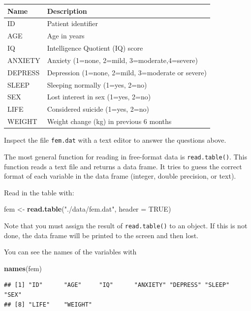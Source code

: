 \documentclass[
]{book}
\newenvironment{Shaded}{\begin{snugshade}}{\end{snugshade}}
\newcommand{\AttributeTok}[1]{\textcolor[rgb]{0.13,0.29,0.53}{#1}}
\newcommand{\ConstantTok}[1]{\textcolor[rgb]{0.56,0.35,0.01}{#1}}
\newcommand{\FunctionTok}[1]{\textcolor[rgb]{0.13,0.29,0.53}{\textbf{#1}}}
\newcommand{\NormalTok}[1]{#1}
\newcommand{\OtherTok}[1]{\textcolor[rgb]{0.56,0.35,0.01}{#1}}
\newcommand{\StringTok}[1]{\textcolor[rgb]{0.31,0.60,0.02}{#1}}
\begin{document}
\begin{longtable}[]{@{}ll@{}}
\toprule\noalign{}
Name & Description \\
\midrule\noalign{}
\endhead
\bottomrule\noalign{}
\endlastfoot
ID & Patient identifier \\
AGE & Age in years \\
IQ & Intelligence Quotient (IQ) score \\
ANXIETY & Anxiety (1=none, 2=mild, 3=moderate,4=severe) \\
DEPRESS & Depression (1=none, 2=mild, 3=moderate or severe) \\
SLEEP & Sleeping normally (1=yes, 2=no) \\
SEX & Lost interest in sex (1=yes, 2=no) \\
LIFE & Considered suicide (1=yes, 2=no) \\
WEIGHT & Weight change (kg) in previous 6 months \\
\end{longtable}

Inspect the file \texttt{fem.dat} with a text editor to answer the
questions above.

The most general function for reading in free-format data is
\texttt{read.table()}. This function reads a text file and returns a
data frame. It tries to guess the correct format of each variable in
the data frame (integer, double precision, or text).

Read in the table with:

\begin{Shaded}
\begin{Highlighting}[]
\NormalTok{fem }\OtherTok{\textless{}{-}} \FunctionTok{read.table}\NormalTok{(}\StringTok{"./data/fem.dat"}\NormalTok{, }\AttributeTok{header =} \ConstantTok{TRUE}\NormalTok{)}
\end{Highlighting}
\end{Shaded}

Note that you must assign the result of \texttt{read.table()} to an
object. If this is not done, the data frame will be printed to the
screen and then lost.

You can see the names of the variables with

\begin{Shaded}
\begin{Highlighting}[]
\FunctionTok{names}\NormalTok{(fem)}
\end{Highlighting}
\end{Shaded}

\begin{verbatim}
## [1] "ID"      "AGE"     "IQ"      "ANXIETY" "DEPRESS" "SLEEP"   "SEX"    
## [8] "LIFE"    "WEIGHT"
\end{verbatim}
\end{document}
